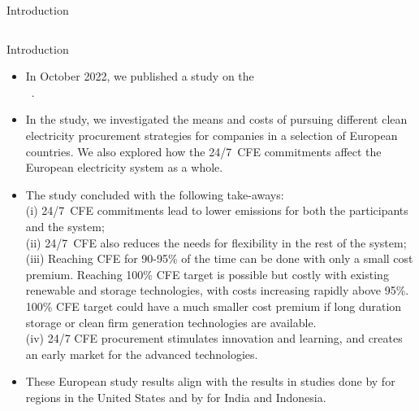\begin{frame}{Introduction}
{\begin{columns}[T]
  \end{columns}

  }
\end{frame}


\begin{frame}{Introduction}

  {\footnotesize
  \begin{itemize}
  \item In October 2022, we published a study on the  \\
  \faGithub~. 
  
  \item In the study, we investigated the \alert{means and costs} of pursuing different clean electricity procurement strategies for companies in a selection of European countries. We also explored how the 24/7~CFE commitments \alert{affect the European electricity system} as a whole. 
  
  \item The study concluded with the following take-aways: \\ 
  (i) 24/7~CFE commitments lead to lower emissions for both the
  participants and the system;\\ 
  (ii) 24/7~CFE also reduces the needs for flexibility in the rest of the system; \\ 
  (iii) Reaching CFE for 90-95\% of the time can be done with only a small cost premium. Reaching 100\% CFE target is possible but costly with existing renewable and storage technologies, with costs increasing rapidly above 95\%. 100\% CFE target could have a much smaller cost premium if long duration storage or clean firm generation technologies are available. \\ 
  (iv) 24/7 CFE procurement stimulates innovation and learning, and creates an early market for the advanced technologies.

  \item  These European study results align with the results in studies done by  for regions in the United States and by  for India and Indonesia.

  \end{itemize}
  }

\end{frame}
  


